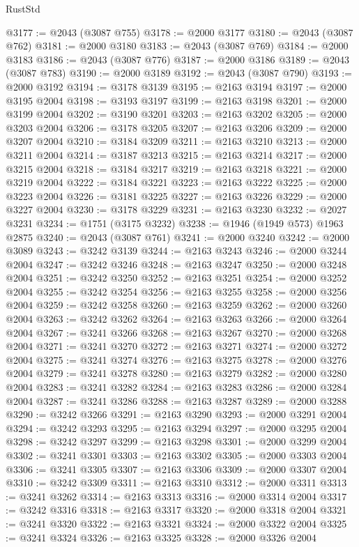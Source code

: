 \begin{lexlean}{RustStd}
\begin{coremodule}
@3177 := @2043 (@3087 @755)
@3178 := @2000 @3177
@3180 := @2043 (@3087 @762)
@3181 := @2000 @3180
@3183 := @2043 (@3087 @769)
@3184 := @2000 @3183
@3186 := @2043 (@3087 @776)
@3187 := @2000 @3186
@3189 := @2043 (@3087 @783)
@3190 := @2000 @3189
@3192 := @2043 (@3087 @790)
@3193 := @2000 @3192
@3194 := @3178 @3139
@3195 := @2163 @3194
@3197 := @2000 @3195 @2004
@3198 := @3193 @3197
@3199 := @2163 @3198
@3201 := @2000 @3199 @2004
@3202 := @3190 @3201
@3203 := @2163 @3202
@3205 := @2000 @3203 @2004
@3206 := @3178 @3205
@3207 := @2163 @3206
@3209 := @2000 @3207 @2004
@3210 := @3184 @3209
@3211 := @2163 @3210
@3213 := @2000 @3211 @2004
@3214 := @3187 @3213
@3215 := @2163 @3214
@3217 := @2000 @3215 @2004
@3218 := @3184 @3217
@3219 := @2163 @3218
@3221 := @2000 @3219 @2004
@3222 := @3184 @3221
@3223 := @2163 @3222
@3225 := @2000 @3223 @2004
@3226 := @3181 @3225
@3227 := @2163 @3226
@3229 := @2000 @3227 @2004
@3230 := @3178 @3229
@3231 := @2163 @3230
@3232 := @2027 @3231
@3234 := @1751 (@3175 @3232)
@3238 := @1946 (@1949 @573) @1963 @2875
@3240 := @2043 (@3087 @761)
@3241 := @2000 @3240
@3242 := @2000 @3089
@3243 := @3242 @3139
@3244 := @2163 @3243
@3246 := @2000 @3244 @2004
@3247 := @3242 @3246
@3248 := @2163 @3247
@3250 := @2000 @3248 @2004
@3251 := @3242 @3250
@3252 := @2163 @3251
@3254 := @2000 @3252 @2004
@3255 := @3242 @3254
@3256 := @2163 @3255
@3258 := @2000 @3256 @2004
@3259 := @3242 @3258
@3260 := @2163 @3259
@3262 := @2000 @3260 @2004
@3263 := @3242 @3262
@3264 := @2163 @3263
@3266 := @2000 @3264 @2004
@3267 := @3241 @3266
@3268 := @2163 @3267
@3270 := @2000 @3268 @2004
@3271 := @3241 @3270
@3272 := @2163 @3271
@3274 := @2000 @3272 @2004
@3275 := @3241 @3274
@3276 := @2163 @3275
@3278 := @2000 @3276 @2004
@3279 := @3241 @3278
@3280 := @2163 @3279
@3282 := @2000 @3280 @2004
@3283 := @3241 @3282
@3284 := @2163 @3283
@3286 := @2000 @3284 @2004
@3287 := @3241 @3286
@3288 := @2163 @3287
@3289 := @2000 @3288
@3290 := @3242 @3266
@3291 := @2163 @3290
@3293 := @2000 @3291 @2004
@3294 := @3242 @3293
@3295 := @2163 @3294
@3297 := @2000 @3295 @2004
@3298 := @3242 @3297
@3299 := @2163 @3298
@3301 := @2000 @3299 @2004
@3302 := @3241 @3301
@3303 := @2163 @3302
@3305 := @2000 @3303 @2004
@3306 := @3241 @3305
@3307 := @2163 @3306
@3309 := @2000 @3307 @2004
@3310 := @3242 @3309
@3311 := @2163 @3310
@3312 := @2000 @3311
@3313 := @3241 @3262
@3314 := @2163 @3313
@3316 := @2000 @3314 @2004
@3317 := @3242 @3316
@3318 := @2163 @3317
@3320 := @2000 @3318 @2004
@3321 := @3241 @3320
@3322 := @2163 @3321
@3324 := @2000 @3322 @2004
@3325 := @3241 @3324
@3326 := @2163 @3325
@3328 := @2000 @3326 @2004

\end{coremodule}
\end{lexlean}
